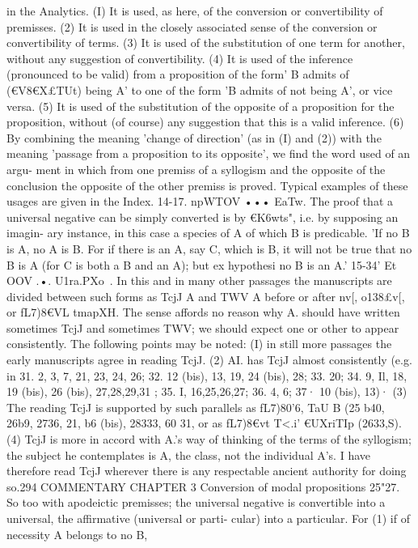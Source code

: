 {in the Analytics. (I) It is used, as here, of the conversion or
convertibility of premisses. (2) It is used in the closely associated
sense of the conversion or convertibility of terms. (3) It is used
of the substitution of one term for another, without any suggestion
of convertibility. (4) It is used of the inference (pronounced to
be valid) from a proposition of the form' B admits of (€V8€X£TUt)
being A' to one of the form 'B admits of not being A', or vice
versa. (5) It is used of the substitution of the opposite of a
proposition for the proposition, without (of course) any suggestion
that this is a valid inference. (6) By combining the meaning 'change
of direction' (as in (I) and (2)) with the meaning 'passage from
a proposition to its opposite', we find the word used of an argu-
ment in which from one premiss of a syllogism and the opposite of
the conclusion the opposite of the other premiss is proved.
Typical examples of these usages are given in the Index.
14-17. npWTOV ••• EaTw. The proof that a universal negative
can be simply converted is by €K6wts", i.e. by supposing an imagin-
ary instance, in this case a species of A of which B is predicable.
'If no B is A, no A is B. For if there is an A, say C, which is B,
it will not be true that no B is A (for C is both a B and an A);
but ex hypothesi no B is an A.'
15-34' Et OOV .•. U1ra.PXo~. In this and in many other passages
the manuscripts are divided between such forms as TcjJ A and
TWV A before or after nv[, o138£v[, or fL7)8€VL tmapXH. The sense
affords no reason why A. should have written sometimes TcjJ
and sometimes TWV; we should expect one or other to appear
consistently. The following points may be noted: (I) in still
more passages the early manuscripts agree in reading TcjJ. (2) AI.
has TcjJ almost consistently (e.g. in 31. 2, 3, 7, 21, 23, 24, 26; 32.
12 (bis), 13, 19, 24 (bis), 28; 33. 20; 34. 9, Il, 18, 19 (bis), 26 (bis),
27,28,29,31 ; 35. I, 16,25,26,27; 36. 4, 6; 37· 10 (bis), 13)· (3) The
reading TcjJ is supported by such parallels as fL7)80'6, TaU B
(25 b40, 26b9, 2736, 21, b6 (bis), 28333, 60 31, or as fL7)8€vt T<.i' €UXriTIp
(2633,S). (4) TcjJ is more in accord with A.'s way of thinking of the
terms of the syllogism; the subject he contemplates is A, the
class, not the individual A's. I have therefore read TcjJ wherever
there is any respectable ancient authority for doing so.294
COMMENTARY
CHAPTER 3
Conversion of modal propositions
25"27. So too with apodeictic premisses; the universal negative
is convertible into a universal, the affirmative (universal or parti-
cular) into a particular. For (1) if of necessity A belongs to no B,
}

